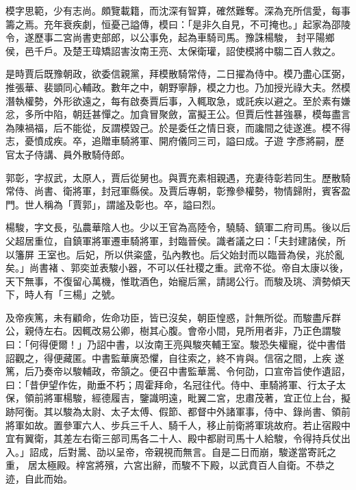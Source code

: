 \begin{pinyinscope}
 模字思範，少有志尚。頗覽載籍，而沈深有智算，確然難奪。深為充所信愛，每事籌之焉。充年衰疾劇，恒憂己謚傳，模曰：「是非久自見，不可掩也。」起家為邵陵令，遂歷事二宮尚書吏部郎，以公事免，起為車騎司馬。豫誅楊駿，
 封平陽鄉侯，邑千戶。及楚王瑋矯詔害汝南王亮、太保衛瓘，詔使模將中騶二百人救之。



 是時賈后既豫朝政，欲委信親黨，拜模散騎常侍，二日擢為侍中。模乃盡心匡弼，推張華、裴顗同心輔政。數年之中，朝野寧靜，模之力也。乃加授光祿大夫。然模潛執權勢，外形欲遠之，每有啟奏賈后事，入輒取急，或託疾以避之。至於素有嫌忿，多所中陷，朝廷甚憚之。加貪冒聚斂，富擬王公。但賈后性甚強暴，模每盡言為陳禍福，后不能從，反謂模毀己。於是委任之情日衰，而讒間之徒遂進。模不得志，憂憤成疾。卒，追贈車騎將軍、開府儀同三司，謚曰成。子遊
 字彥將嗣，歷官太子侍講、員外散騎侍郎。



 郭彰，字叔武，太原人，賈后從舅也。與賈充素相親遇，充妻待彰若同生。歷散騎常侍、尚書、衛將軍，封冠軍縣侯。及賈后專朝，彰豫參權勢，物情歸附，賓客盈門。世人稱為「賈郭」，謂謐及彰也。卒，謚曰烈。



 楊駿，字文長，弘農華陰人也。少以王官為高陸令，驍騎、鎮軍二府司馬。後以后父超居重位，自鎮軍將軍遷車騎將軍，封臨晉侯。識者議之曰：「夫封建諸侯，所以籓屏
 王室也。后妃，所以供粢盛，弘內教也。后父始封而以臨晉為侯，兆於亂矣。」尚書褚、郭奕並表駿小器，不可以任社稷之重。武帝不從。帝自太康以後，天下無事，不復留心萬機，惟耽酒色，始寵后黨，請謁公行。而駿及珧、濟勢傾天下，時人有「三楊」之號。



 及帝疾篤，未有顧命，佐命功臣，皆已沒矣，朝臣惶惑，計無所從。而駿盡斥群公，親侍左右。因輒改易公卿，樹其心腹。會帝小間，見所用者非，乃正色謂駿曰：「何得便爾！」乃詔中書，以汝南王亮與駿夾輔王室。駿恐失權寵，從中書借詔觀之，得便藏匿。中書監華廙恐懼，自往索之，終不肯與。信宿之間，上疾
 遂篤，后乃奏帝以駿輔政，帝頷之。便召中書監華暠、令何劭，口宣帝旨使作遺詔，曰：「昔伊望作佐，勛垂不朽；周霍拜命，名冠往代。侍中、車騎將軍、行太子太保，領前將軍楊駿，經德履吉，鑒識明遠，毗翼二宮，忠肅茂著，宜正位上台，擬跡阿衡。其以駿為太尉、太子太傅、假節、都督中外諸軍事，侍中、錄尚書、領前將軍如故。置參軍六人、步兵三千人、騎千人，移止前衛將軍珧故府。若止宿殿中宜有翼衛，其差左右衛三部司馬各二十人、殿中都尉司馬十人給駿，令得持兵仗出入。」詔成，后對暠、劭以呈帝，帝親視而無言。自是二日而崩，駿遂當寄託之重，
 居太極殿。梓宮將殯，六宮出辭，而駿不下殿，以武賁百人自衛。不恭之迹，自此而始。




\end{pinyinscope}
